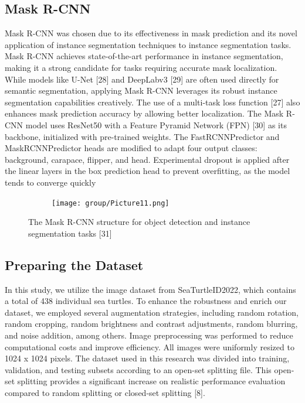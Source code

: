 \documentclass[conference]{IEEEtran}
\begin{document}
\subsection{Mask R-CNN}
Mask R-CNN was chosen due to its effectiveness in mask prediction and its novel application of instance segmentation techniques to instance segmentation tasks. Mask R-CNN achieves state-of-the-art performance in instance segmentation, making it a strong candidate for tasks requiring accurate mask localization. While models like U-Net [28] and DeepLabv3 [29] are often used directly for semantic segmentation, applying Mask R-CNN leverages its robust instance segmentation capabilities creatively. The use of a multi-task loss function [27] also enhances mask prediction accuracy by allowing better localization. 
The Mask R-CNN model uses ResNet50 with a Feature Pyramid Network (FPN) [30] as its backbone, initialized with pre-trained weights. The FastRCNNPredictor and MaskRCNNPredictor heads are modified to adapt four output classes: background, carapace, flipper, and head. Experimental dropout is applied after the linear layers in the box prediction head to prevent overfitting, as the model tends to converge quickly
\begin{figure}[h]
    \centering
    \begin{subfigure}[t]{0.4\textwidth}
        \centering
        \texttt{[image: group/Picture11.png]}
    \end{subfigure}%
    \caption{The Mask R-CNN structure for object detection and instance segmentation tasks [31]}
\end{figure}
\subsection{Preparing the Dataset}
In this study, we utilize the image dataset from SeaTurtleID2022, which contains a total of 438 individual sea turtles. To enhance the robustness and enrich our dataset, we employed several augmentation strategies, including random rotation, random cropping, random brightness and contrast adjustments, random blurring, and noise addition, among others. Image preprocessing was performed to reduce computational costs and improve efficiency. All images were uniformly resized to 1024 x 1024 pixels. The dataset used in this research was divided into training, validation, and testing subsets according to an open-set splitting file. This open-set splitting provides a significant increase on realistic performance evaluation compared to random splitting or closed-set splitting [8]. 
\end{document}
